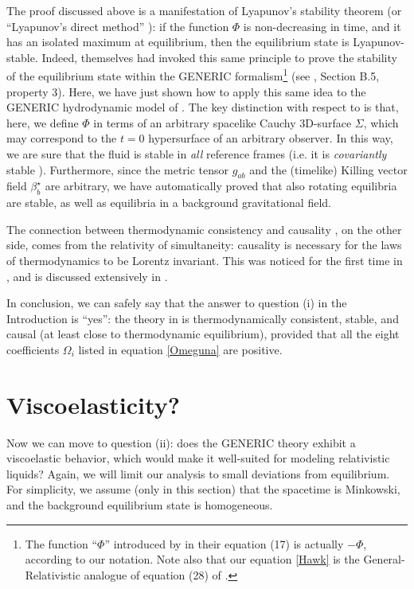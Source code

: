 \documentclass[a4paper, amsfonts, amssymb, amsmath, reprint, showkeys, nofootinbib, twoside, onecolumn, notitlepage]{revtex4-1}
\theoremstyle{definition}
\theoremstyle{theorem}
\begin{document}
The proof discussed above is a manifestation of Lyapunov's stability theorem (or ``Lyapunov's direct method'' \cite{lasalle1961stability}): if the function $\Phi$ is non-decreasing in time, and it has an isolated maximum at equilibrium, then the equilibrium state is Lyapunov-stable. Indeed, \citet{Grmela1997} themselves had invoked this same principle to prove the stability of the equilibrium state within the GENERIC formalism\footnote{
    The function ``$\Phi$'' introduced by \citet{Grmela1997} in their equation (17) is actually $-\Phi$, according to our notation. Note also that our equation \eqref{Hawk} is the General-Relativistic analogue of equation (28) of \cite{Grmela1997}.
} (see \cite{Grmela1997}, Section B.5, property 3). Here, we have just shown how to apply this same idea to the GENERIC hydrodynamic model of \citet{Stricker2019}. The key distinction with respect to \cite{Grmela1997} is that, here, we define $\Phi$ in terms of an arbitrary spacelike Cauchy 3D-surface $\Sigma$, which may correspond to the $ t=0 $ hypersurface of an arbitrary observer. In this way, we are sure that the fluid is stable in \emph{all} reference frames (i.e. it is \textit{covariantly} stable \cite{GavassinoSuperlum2021,GavassinoBounds2023}). Furthermore, since the metric tensor $g_{ab}$ and the (timelike) Killing vector field $\beta^\star_b$ are arbitrary, we have automatically proved that also rotating equilibria are stable, as well as equilibria in a background gravitational field. 

The connection between thermodynamic consistency and causality \cite{GavassinoCausality2021}, on the other side, comes from the relativity of simultaneity: causality is necessary for the laws of thermodynamics to be Lorentz invariant. This was noticed for the first time in \cite{GavassinoLyapunov_2020}, and is discussed extensively in \cite{GavassinoSuperlum2021}.

In conclusion, we can safely say that the answer to question (i) in the Introduction is ``yes'': the theory in \cite{Stricker2019} is thermodynamically consistent, stable, and causal (at least close to thermodynamic equilibrium), provided that all the eight coefficients $\Omega_i$ listed in equation \eqref{Omeguna} are positive. 


\section{Viscoelasticity?}
\label{visco?}

Now we can move to question (ii): does the GENERIC theory exhibit a viscoelastic behavior, which would make it well-suited for modeling relativistic liquids? Again, we will limit our analysis to small deviations from equilibrium. For simplicity, we assume (only in this section) that the spacetime is Minkowski, and the background equilibrium state is homogeneous.
\end{document}
